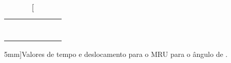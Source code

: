 \begin{table*}[!ht]
\begin{tabular}{lp{25mm}p{25mm}p{25mm}p{25mm}p{25mm}l}
	& \cellcolor[gray]{0.95} & \cellcolor[gray]{0.97} & \cellcolor[gray]{0.95} \\ 
	& \cellcolor[gray]{0.89} & \cellcolor[gray]{0.92} & \cellcolor[gray]{0.89} \\ 
	& \cellcolor[gray]{0.95} & \cellcolor[gray]{0.97} & \cellcolor[gray]{0.95} \\ 
	& \cellcolor[gray]{0.89} & \cellcolor[gray]{0.92} & \cellcolor[gray]{0.89} \\ 
	& \cellcolor[gray]{0.95} & \cellcolor[gray]{0.97} & \cellcolor[gray]{0.95} \\ 
	& \cellcolor[gray]{0.89} & \cellcolor[gray]{0.92} & \cellcolor[gray]{0.89} \\ 
	& \cellcolor[gray]{0.95} & \cellcolor[gray]{0.97} & \cellcolor[gray]{0.95} \\ 
	\cmidrule{2-4}
\bottomrule
\end{tabular}
\caption[][5mm]{Valores de tempo e deslocamento para o MRU para o ângulo de .}
\label{DadosMRU}
\end{table*}

